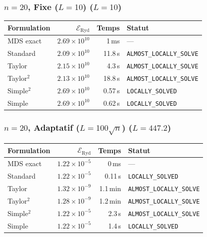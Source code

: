 \subsubsection{$n=20$, Fixe ($L{=}10$) ($L=10$)}
\begin{longtable}{@{}lrrl@{}}
  \toprule
  Formulation & $\mathcal{E}_{\mathrm{Ryd}}$ & Temps & Statut \\
  \midrule
  \endhead
  MDS exact & $2.69\times10^{10}$ & 1\,ms & --- \\
  Standard & $2.09\times10^{10}$ & 11.8\,s & \texttt{ALMOST\_LOCALLY\_SOLVE} \\
  Taylor & $2.15\times10^{10}$ & 4.3\,s & \texttt{ALMOST\_LOCALLY\_SOLVE} \\
  Taylor$^2$ & $2.13\times10^{10}$ & 18.8\,s & \texttt{ALMOST\_LOCALLY\_SOLVE} \\
  Simple$^2$ & $2.69\times10^{10}$ & 0.57\,s & \texttt{LOCALLY\_SOLVED} \\
  Simple & $2.69\times10^{10}$ & 0.62\,s & \texttt{LOCALLY\_SOLVED} \\
  \bottomrule
\end{longtable}

\subsubsection{$n=20$, Adaptatif ($L{=}100\sqrt{n}$) ($L=447.2$)}
\begin{longtable}{@{}lrrl@{}}
  \toprule
  Formulation & $\mathcal{E}_{\mathrm{Ryd}}$ & Temps & Statut \\
  \midrule
  \endhead
  MDS exact & $1.22\times10^{-5}$ & 0\,ms & --- \\
  Standard & $1.22\times10^{-5}$ & 0.11\,s & \texttt{LOCALLY\_SOLVED} \\
  Taylor & $1.32\times10^{-9}$ & 1.1\,min & \texttt{ALMOST\_LOCALLY\_SOLVE} \\
  Taylor$^2$ & $1.28\times10^{-9}$ & 1.2\,min & \texttt{ALMOST\_LOCALLY\_SOLVE} \\
  Simple$^2$ & $1.22\times10^{-5}$ & 2.3\,s & \texttt{ALMOST\_LOCALLY\_SOLVE} \\
  Simple & $1.22\times10^{-5}$ & 1.4\,s & \texttt{LOCALLY\_SOLVED} \\
  \bottomrule
\end{longtable}

